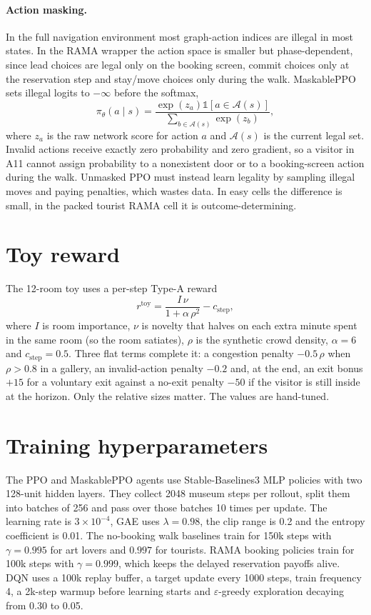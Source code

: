\documentclass[11pt]{article}
\newcommand{\Acal}{\mathcal{A}}
\newcommand{\ind}{\mathbb{1}}
\begin{document}
\paragraph{Action masking.}
In the full navigation environment most graph-action indices are illegal in most states. In the RAMA
wrapper the action space is smaller but phase-dependent, since lead choices are legal only on the
booking screen, commit choices only at the reservation step and stay/move choices only during the
walk. MaskablePPO sets illegal logits to $-\infty$ before the softmax,
\[
\pi_\theta(a\mid s)=
\frac{\exp(z_a)\ind[a\in\Acal(s)]}{\sum_{b\in\Acal(s)}\exp(z_b)},
\]
where $z_a$ is the raw network score for action $a$ and $\Acal(s)$ is the current legal set. Invalid
actions receive exactly zero probability and zero gradient, so a visitor in A11 cannot assign
probability to a nonexistent door or to a booking-screen action during the walk. Unmasked PPO must
instead learn legality by sampling illegal moves and paying penalties, which wastes data. In easy cells
the difference is small, in the packed tourist RAMA cell it is outcome-determining.

\section{Toy reward}
\label{app:toyreward}

The 12-room toy uses a per-step Type-A reward
\[
r^{\text{toy}}=\frac{I\,\nu}{1+\alpha\,\rho^2}-c_{\text{step}},
\]
where $I$ is room importance, $\nu$ is novelty that halves on each extra minute spent in the same room
(so the room satiates), $\rho$ is the synthetic crowd density, $\alpha=6$ and $c_{\text{step}}=0.5$.
Three flat terms complete it: a congestion penalty $-0.5\,\rho$ when $\rho>0.8$ in a gallery, an
invalid-action penalty $-0.2$ and, at the end, an exit bonus $+15$ for a voluntary exit against a
no-exit penalty $-50$ if the visitor is still inside at the horizon. Only the relative sizes matter.
The values are hand-tuned.

\section{Training hyperparameters}
\label{app:hparams}

The PPO and MaskablePPO agents use Stable-Baselines3 MLP policies with two 128-unit hidden layers. They
collect 2048 museum steps per rollout, split them into batches of 256 and pass over those batches 10
times per update. The learning rate is $3\times10^{-4}$, GAE uses $\lambda=0.98$, the clip range is
0.2 and the entropy coefficient is 0.01. The no-booking walk baselines train for 150k steps with
$\gamma=0.995$ for art lovers and $0.997$ for tourists. RAMA booking policies train for 100k steps with
$\gamma=0.999$, which keeps the delayed reservation payoffs alive. DQN uses a 100k replay buffer, a
target update every 1000 steps, train frequency 4, a 2k-step warmup before learning starts and
$\varepsilon$-greedy exploration decaying from 0.30 to 0.05.
\end{document}
